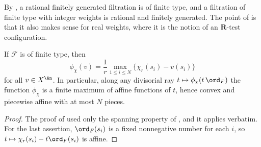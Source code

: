 By , a rational finitely generated
filtration is of finite type, and a filtration of finite type with integer
weights is rational and finitely generated.  The point of
 is that it also makes sense for real weights,
where it is the notion of an $\mathbf R$-test configuration.

\begin{lemma}\label{lem:ch33-finite-type-pl}
If $\mathcal F$ is of finite type, then
\begin{equation}
\label{eq:ch33-finite-type-max}
 \phi_\chi(v)=\frac1r\max_{1\leq i\leq N}\{\chi_r(s_i)-v(s_i)\}
\end{equation}
for all $v\in X^{\An}$.  In particular, along any divisorial ray
$t\mapsto\phi_\chi(t\,\ord_F)$ the function $\phi_\chi$ is a finite
maximum of affine functions of $t$, hence convex and piecewise affine with
at most $N$ pieces.
\end{lemma}

\begin{proof}
The proof of  used only the spanning property
of , and it applies verbatim.  For the last
assertion, $\ord_F(s_i)$ is a fixed nonnegative number for each $i$, so
$t\mapsto\chi_r(s_i)-t\ord_F(s_i)$ is affine.
\end{proof}

